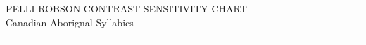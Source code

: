 \documentclass{article}
\newcommand{\chartheader}{
    \centering
    \vspace*{-1cm}
    {\headerfont\Huge PELLI-ROBSON CONTRAST SENSITIVITY CHART}\\[0.5cm]
    {\headerfont\large Canadian Aborignal Syllabics}\\[0.3cm]
    \rule{\textwidth}{1pt}\\[0.5cm]
}
\begin{document}
\chartheader

\begin{longtable}{ccc}
\end{longtable}
\end{document}
